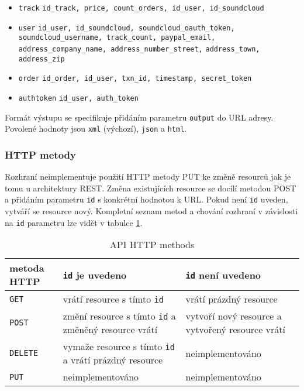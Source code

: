 \documentclass[12pt]{article}
\begin{document}
\begin{itemize}
\item{\texttt{track}}\newline
  \verb|id_track, price, count_orders, id_user, id_soundcloud|
\item{\texttt{user}}\newline
  \verb|id_user, id_soundcloud, soundcloud_oauth_token,|
  \verb|soundcloud_username, track_count, paypal_email,|
  \verb|address_company_name, address_number_street,|
  \verb|address_town, address_zip|
\item{\texttt{order}}\newline
  \verb|id_order, id_user, txn_id, timestamp, secret_token|
\item{\texttt{authtoken}}\newline
  \verb|id_user, auth_token|
\end{itemize}

Formát výstupu se specifikuje přidáním parametru \texttt{output} do URL adresy. Povolené hodnoty jsou \texttt{xml} (výchozí), \texttt{json} a \texttt{html}.

\subsubsection{HTTP metody}
Rozhraní neimplementuje použití HTTP metody PUT ke změně resourců jak je tomu u architektury REST. Změna existujících resource se docílí metodou POST a přidáním parametru \texttt{id} s konkrétní hodnotou k URL. Pokud není \texttt{id} uveden, vytváří se resource nový. Kompletní seznam metod a chování rozhraní v závislosti na \texttt{id} parametru lze vidět v tabulce \ref{api:http}.

\begin{table}[ht]
  \begin{center}
    \begin{tabular}{ | l | p{5cm} | p{5cm} |} \hline
      metoda HTTP & \texttt{id} je uvedeno & \texttt{id} není uvedeno \\ \hline\hline
      \texttt{GET} & vrátí resource s tímto \texttt{id} & vrátí prázdný resource \\ \hline
      \texttt{POST} & změní resource s tímto \texttt{id} a změněný resource vrátí & vytvoří nový resource a vytvořený resource vrátí \\ \hline
      \texttt{DELETE} & vymaže resource s tímto \texttt{id} a vrátí prázdný resource & neimplementováno \\ \hline
      \texttt{PUT} & neimplementováno & neimplementováno \\ \hline
    \end{tabular}
    \caption{API HTTP methods} \label{api:http}
  \end{center}
\end{table}
\end{document}
